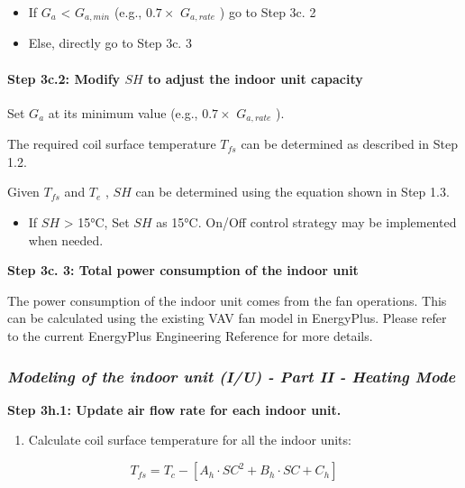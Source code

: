 \begin{itemize}
\item
  If \(G_a\) \textless{} \(G_{a,min}\) (e.g., \(0.7\times\) \(G_{a,rate}\) ) go to Step 3c. 2
\item
  Else, directly go to Step 3c. 3
\end{itemize}

\paragraph{Step 3c.2: Modify \(SH\) to adjust the indoor unit capacity}\label{step-3c.2-modify-sh-to-adjust-the-indoor-unit-capacity}

Set \(G_a\) at its minimum value (e.g., \(0.7\times\) \(G_{a,rate}\) ).

The required coil surface temperature \(T_{fs}\) can be determined as described in Step 1.2.

Given \(T_{fs}\) and \(T_e\) , \(SH\) can be determined using the equation shown in Step 1.3.

\begin{itemize}
\tightlist
\item
  If \(SH\) \textgreater{} 15°C, Set \(SH\) as 15°C. On/Off control strategy may be implemented when needed.
\end{itemize}

\textbf{Step 3c. 3: Total power consumption of the indoor unit}

The power consumption of the indoor unit comes from the fan operations. This can be calculated using the existing VAV fan model in EnergyPlus. Please refer to the current EnergyPlus Engineering Reference for more details.

\subsubsection{\emph{Modeling of the indoor unit (I/U) - Part II - Heating Mode}}\label{modeling-of-the-indoor-unit-iu---part-ii---heating-mode}

\textbf{Step 3h.1: Update air flow rate for each indoor unit.} 

\begin{enumerate}
\def\labelenumi{\arabic{enumi})}
\tightlist
\item
  Calculate coil surface temperature for all the indoor units:
\end{enumerate}

\begin{equation}
T_{fs} = T_c-[A_h\cdot SC^2+B_h\cdot SC+C_h]
\end{equation}

